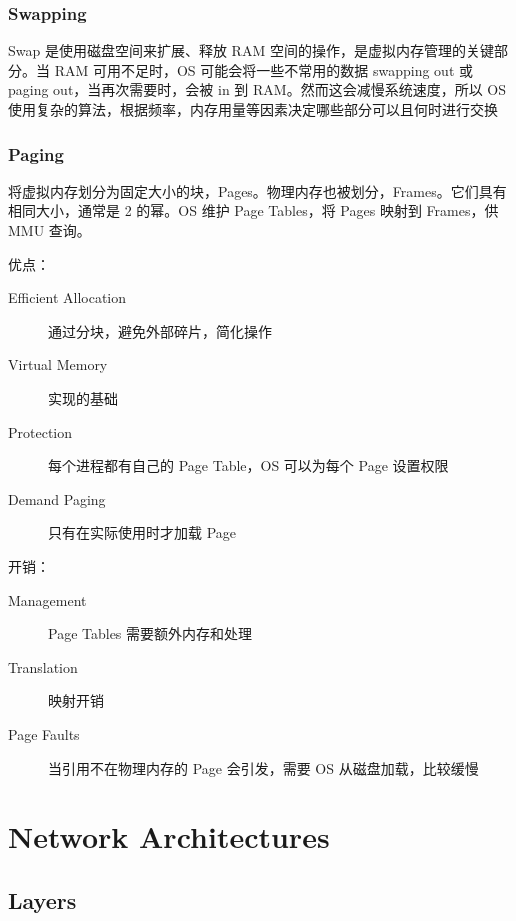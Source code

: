 \documentclass[11pt,journal,compsoc]{IEEEtran}
\begin{document}
\subsubsection{Swapping}

Swap 是使用磁盘空间来扩展、释放 RAM 空间的操作，是虚拟内存管理的关键部分。当 RAM 可用不足时，OS 可能会将一些不常用的数据 swapping out 或 paging out，当再次需要时，会被 in 到 RAM。然而这会减慢系统速度，所以 OS 使用复杂的算法，根据频率，内存用量等因素决定哪些部分可以且何时进行交换

\subsubsection{Paging}

将虚拟内存划分为固定大小的块，Pages。物理内存也被划分，Frames。它们具有相同大小，通常是 2 的幂。OS 维护 Page Tables，将 Pages 映射到 Frames，供 MMU 查询。

优点：

\begin{description}
    \item[Efficient Allocation] 通过分块，避免外部碎片，简化操作

    \item[Virtual Memory] 实现的基础

    \item[Protection] 每个进程都有自己的 Page Table，OS 可以为每个 Page 设置权限

    \item[Demand Paging] 只有在实际使用时才加载 Page
\end{description}

开销：

\begin{description}
    \item[Management] Page Tables 需要额外内存和处理

    \item[Translation] 映射开销

    \item[Page Faults] 当引用不在物理内存的 Page 会引发，需要 OS 从磁盘加载，比较缓慢
\end{description}


\section{Network Architectures}


\subsection{Layers}
\end{document}
